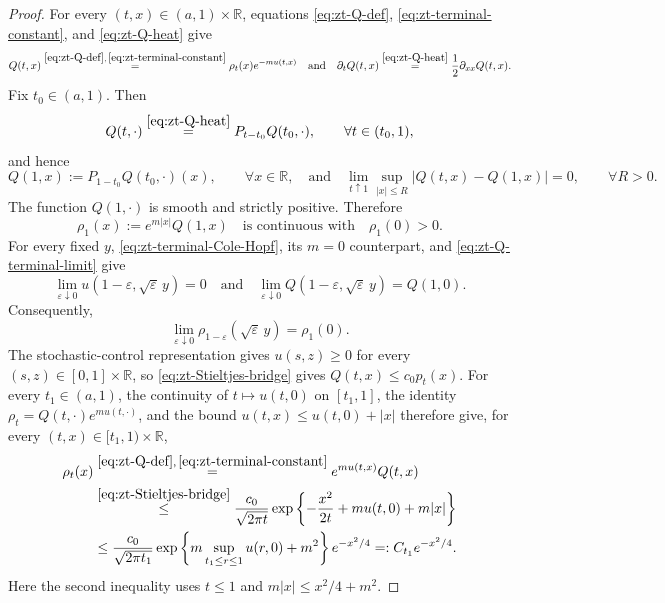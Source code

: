 \documentclass[10pt]{amsart}
\theoremstyle{definition}
\theoremstyle{remark}
\numberwithin{equation}{section}
\newcommand{\R}{\mathbb R}
\newcommand{\1}{\mathbf 1}
\newcommand{\stackref}[2]{\stackrel{#2}{#1}}
\begin{document}
\begin{proof}
For every $(t,x)\in(a,1)\times\R$, equations \eqref{eq:zt-Q-def}, \eqref{eq:zt-terminal-constant}, and \eqref{eq:zt-Q-heat} give
\begin{equation*}
 Q(t,x)\stackref{=}{\eqref{eq:zt-Q-def},\,\eqref{eq:zt-terminal-constant}}\rho_t(x)e^{-mu(t,x)}
 \quad\text{and}\quad
 \partial_tQ(t,x)\stackref{=}{\eqref{eq:zt-Q-heat}}\frac12\partial_{xx}Q(t,x).
\end{equation*}
Fix $t_0\in(a,1)$. Then
\begin{equation*}
 Q(t,\cdot)\stackref{=}{\eqref{eq:zt-Q-heat}}P_{t-t_0}Q(t_0,\cdot),
 \qquad \forall t\in(t_0,1),
\end{equation*}
and hence
\begin{equation}
 Q(1,x):=P_{1-t_0}Q(t_0,\cdot)(x),
 \qquad \forall x\in\R,
 \quad\text{and}\quad
 \lim_{t\uparrow1}\sup_{|x|\leq R}|Q(t,x)-Q(1,x)|=0,
 \qquad \forall R>0.
 \label{eq:zt-Q-terminal-limit}
\end{equation}
The function $Q(1,\cdot)$ is smooth and strictly positive. Therefore
\begin{equation}
 \rho_1(x):=e^{m|x|}Q(1,x)
 \quad\text{is continuous with}\quad \rho_1(0)>0.
 \label{eq:zt-rho-one}
\end{equation}
For every fixed $y$, \eqref{eq:zt-terminal-Cole-Hopf}, its $m=0$ counterpart, and \eqref{eq:zt-Q-terminal-limit} give
\begin{equation*}
 \lim_{\varepsilon\downarrow0}u(1-\varepsilon,\sqrt\varepsilon\,y)=0
 \quad\text{and}\quad
 \lim_{\varepsilon\downarrow0}Q(1-\varepsilon,\sqrt\varepsilon\,y)=Q(1,0).
\end{equation*}
Consequently,
\begin{equation}
 \lim_{\varepsilon\downarrow0}\rho_{1-\varepsilon}(\sqrt\varepsilon\,y)=\rho_1(0).
 \label{eq:zt-rho-boundary-limit}
\end{equation}
The stochastic-control representation gives $u(s,z)\geq0$ for every $(s,z)\in[0,1]\times\R$, so \eqref{eq:zt-Stieltjes-bridge} gives $Q(t,x)\leq c_0p_t(x)$. For every $t_1\in(a,1)$, the continuity of $t\mapsto u(t,0)$ on $[t_1,1]$, the identity $\rho_t=Q(t,\cdot)e^{mu(t,\cdot)}$, and the bound $u(t,x)\leq u(t,0)+|x|$ therefore give, for every $(t,x)\in[t_1,1)\times\R$,
\begin{align}
 \rho_t(x)
 &\stackref{=}{\eqref{eq:zt-Q-def},\,\eqref{eq:zt-terminal-constant}}
 e^{mu(t,x)}Q(t,x)\notag\\
 &\stackref{\leq}{\eqref{eq:zt-Stieltjes-bridge}}
 \frac{c_0}{\sqrt{2\pi t}}
 \exp\left\{-\frac{x^2}{2t}+m u(t,0)+m|x|\right\}\notag\\
 &\leq
 \frac{c_0}{\sqrt{2\pi t_1}}
 \exp\left\{m\sup_{t_1\leq r\leq1}u(r,0)+m^2\right\}e^{-x^2/4}
 =:C_{t_1}e^{-x^2/4}.
 \label{eq:zt-rho-terminal-Gaussian-bound}
\end{align}
Here the second inequality uses $t\leq1$ and $m|x|\leq x^2/4+m^2$.


\end{proof}
\end{document}
